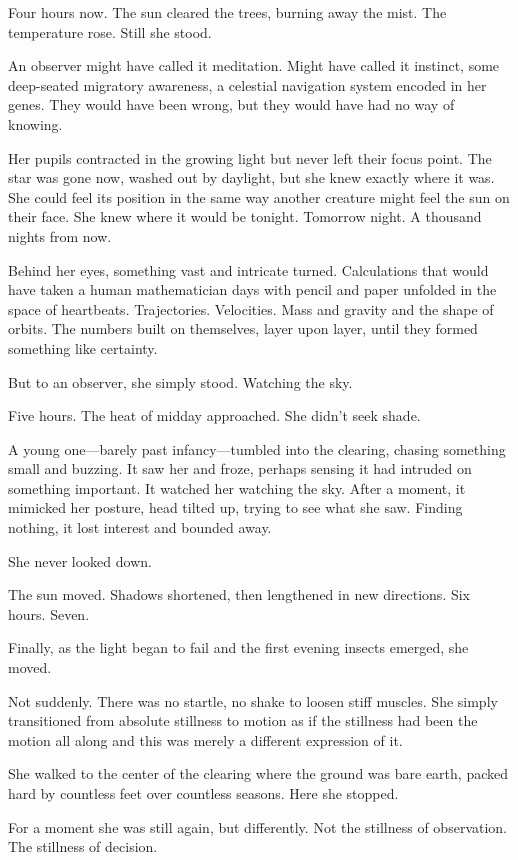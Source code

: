 Four hours now. The sun cleared the trees, burning away the mist. The temperature rose. Still she stood.

An observer might have called it meditation. Might have called it instinct, some deep-seated migratory awareness, a celestial navigation system encoded in her genes. They would have been wrong, but they would have had no way of knowing.

Her pupils contracted in the growing light but never left their focus point. The star was gone now, washed out by daylight, but she knew exactly where it was. She could feel its position in the same way another creature might feel the sun on their face. She knew where it would be tonight. Tomorrow night. A thousand nights from now.

Behind her eyes, something vast and intricate turned. Calculations that would have taken a human mathematician days with pencil and paper unfolded in the space of heartbeats. Trajectories. Velocities. Mass and gravity and the shape of orbits. The numbers built on themselves, layer upon layer, until they formed something like certainty.

But to an observer, she simply stood. Watching the sky.

Five hours. The heat of midday approached. She didn't seek shade.

A young one—barely past infancy—tumbled into the clearing, chasing something small and buzzing. It saw her and froze, perhaps sensing it had intruded on something important. It watched her watching the sky. After a moment, it mimicked her posture, head tilted up, trying to see what she saw. Finding nothing, it lost interest and bounded away.

She never looked down.

The sun moved. Shadows shortened, then lengthened in new directions. Six hours. Seven.

Finally, as the light began to fail and the first evening insects emerged, she moved.

Not suddenly. There was no startle, no shake to loosen stiff muscles. She simply transitioned from absolute stillness to motion as if the stillness had been the motion all along and this was merely a different expression of it.

She walked to the center of the clearing where the ground was bare earth, packed hard by countless feet over countless seasons. Here she stopped.

For a moment she was still again, but differently. Not the stillness of observation. The stillness of decision.

